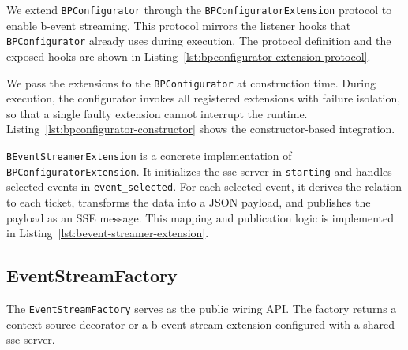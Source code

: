 We extend \texttt{BPConfigurator} through the \texttt{BPConfiguratorExtension} protocol to enable b-event streaming.
This protocol mirrors the listener hooks that \texttt{BPConfigurator} already uses during execution.
The protocol definition and the exposed hooks are shown in Listing~\ref{lst:bpconfigurator-extension-protocol}.
 

 
We pass the extensions to the \texttt{BPConfigurator} at construction time.
During execution, the configurator invokes all registered extensions with failure isolation, so that a single faulty extension cannot interrupt the runtime.
Listing~\ref{lst:bpconfigurator-constructor} shows the constructor-based integration.



\texttt{BEventStreamerExtension} is a concrete implementation of \texttt{BPConfiguratorExtension}.
It initializes the \gls{sse} server in \texttt{starting} and handles selected events in \texttt{event\_selected}.
For each selected event, it derives the relation to each ticket, transforms the data into a JSON payload, and publishes the payload as an SSE message.
This mapping and publication logic is implemented in Listing~\ref{lst:bevent-streamer-extension}.



\subsection{EventStreamFactory}
\label{subsec:impl_fmbp_factory}
 
The \texttt{EventStreamFactory} serves as the public wiring API.
The factory returns a context source decorator or a b-event stream extension configured with a shared \gls{sse} server.
 
